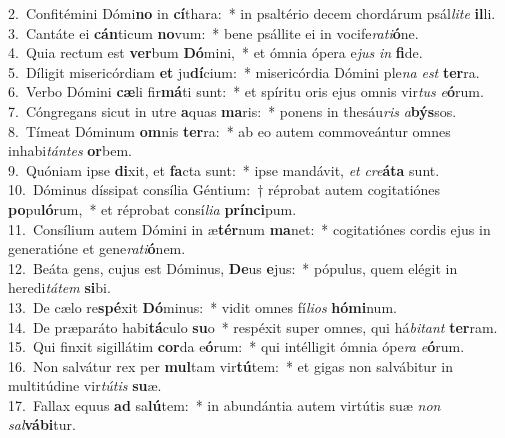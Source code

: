 {2.~}Confitémini Dómi\textbf{no} in \textbf{cí}thara:~* in psaltério decem chordárum psál\textit{li}\textit{te} \textbf{il}li.\\
{3.~}Cantáte ei \textbf{cán}ticum \textbf{no}vum:~* bene psállite ei in vocife\textit{ra}\textit{ti}\textbf{ó}ne.\\
{4.~}Quia rectum est \textbf{ver}bum \textbf{Dó}mini,~* et ómnia ópera e\textit{jus} \textit{in} \textbf{fi}de.\\
{5.~}Díligit misericórdiam \textbf{et} ju\textbf{dí}cium:~* misericórdia Dómini ple\textit{na} \textit{est} \textbf{ter}ra.\\
{6.~}Verbo Dómini \textbf{cæ}li fir\textbf{má}ti sunt:~* et spíritu oris ejus omnis vir\textit{tus} \textit{e}\textbf{ó}rum.\\
{7.~}Cóngregans sicut in utre \textbf{a}quas \textbf{ma}ris:~* ponens in thesáu\textit{ris} \textit{a}\textbf{býs}sos.\\
{8.~}Tímeat Dóminum \textbf{om}nis \textbf{ter}ra:~* ab eo autem commoveántur omnes inhabi\textit{tán}\textit{tes} \textbf{or}bem.\\
{9.~}Quóniam ipse \textbf{di}xit, et \textbf{fa}cta sunt:~* ipse mandávit, \textit{et} \textit{cre}\textbf{á}\textbf{ta} sunt.\\
{10.~}Dóminus díssipat consília Géntium:~† réprobat autem cogitatiónes \textbf{po}pu\textbf{ló}rum,~* et réprobat consí\textit{li}\textit{a} \textbf{prín}\textbf{ci}pum.\\
{11.~}Consílium autem Dómini in æ\textbf{tér}num \textbf{ma}net:~* cogitatiónes cordis ejus in generatióne et gene\textit{ra}\textit{ti}\textbf{ó}nem.\\
{12.~}Beáta gens, cujus est Dóminus, \textbf{De}us \textbf{e}jus:~* pópulus, quem elégit in heredi\textit{tá}\textit{tem} \textbf{si}bi.\\
{13.~}De cælo re\textbf{spé}xit \textbf{Dó}minus:~* vidit omnes fí\textit{li}\textit{os} \textbf{hó}\textbf{mi}num.\\
{14.~}De præparáto habi\textbf{tá}culo \textbf{su}o~* respéxit super omnes, qui há\textit{bi}\textit{tant} \textbf{ter}ram.\\
{15.~}Qui finxit sigillátim \textbf{cor}da e\textbf{ó}rum:~* qui intélligit ómnia ópe\textit{ra} \textit{e}\textbf{ó}rum.\\
{16.~}Non salvátur rex per \textbf{mul}tam vir\textbf{tú}tem:~* et gigas non salvábitur in multitúdine vir\textit{tú}\textit{tis} \textbf{su}æ.\\
{17.~}Fallax equus \textbf{ad} sa\textbf{lú}tem:~* in abundántia autem virtútis suæ \textit{non} \textit{sal}\textbf{vá}\textbf{bi}tur.\\
